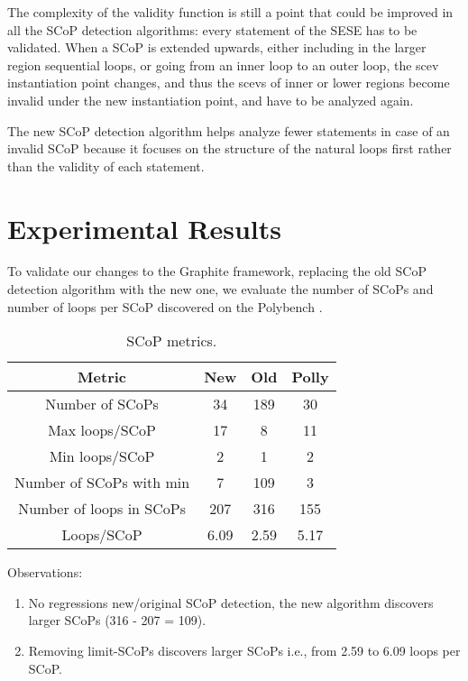 \documentclass{sigplanconf}
\begin{document}
The complexity of the validity function is still a point that could be improved
in all the SCoP detection algorithms: every statement of the SESE has to be
validated.  When a SCoP is extended upwards, either including in the larger
region sequential loops, or going from an inner loop to an outer loop, the scev
instantiation point changes, and thus the scevs of inner or lower regions become
invalid under the new instantiation point, and have to be analyzed again.

The new SCoP detection algorithm helps analyze fewer statements in case of an
invalid SCoP because it focuses on the structure of the natural loops first
rather than the validity of each statement.

\section{Experimental Results}
To validate our changes to the Graphite framework, replacing the old SCoP
detection algorithm with the new one, we evaluate the number of SCoPs and number
of loops per SCoP discovered on the Polybench \cite{polybench}.

\begin{table}[h!]
  \begin{center}
    \begin{tabular}{|c|c|c|c|}
      \hline
      Metric                   & New  & Old  & Polly  \\
      \hline
      Number of SCoPs          & 34   & 189  & 30     \\
      Max loops/SCoP           & 17   & 8    & 11     \\
      Min loops/SCoP           & 2    & 1    & 2      \\
      Number of SCoPs with min & 7    & 109  & 3      \\
      Number of loops in SCoPs & 207  & 316  & 155    \\
      Loops/SCoP               & 6.09 & 2.59 & 5.17   \\
      \hline
    \end{tabular}
  \end{center}
  \caption{SCoP metrics.}
  \label{tab:table1}
\end{table}

Observations:
\begin{enumerate}
  \item No regressions new/original SCoP detection, the new algorithm discovers
    larger SCoPs (316 - 207 = 109).
  \item Removing limit-SCoPs discovers larger SCoPs i.e., from 2.59 to 6.09
    loops per SCoP.
\end{enumerate}
\end{document}
